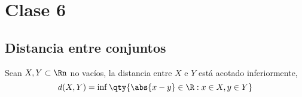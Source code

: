 \chapter{Clase 6}

\section{Distancia entre conjuntos}
Sean $X, Y \subset  \Rn $ no vacíos, la distancia entre $X \text{ e } Y$ está acotado inferiormente,
\begin{equation}
	d(X,Y)= \inf \qty{\abs{x-y } \in \R : x \in X, y \in Y}
\end{equation}

	
